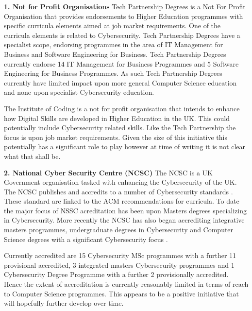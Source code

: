 \documentclass[sigconf,anonymous]{acmart}
\begin{document}
\textbf{1. Not for Profit Organisations}
Tech Partnership Degrees is a Not For Profit Organisation that provides endorsements to Higher Education programmes with specific curricula elements aimed at job market requirements. One of the curricula elements is related to Cybersecurity. Tech Partnership Degrees have a specialist scope, endorsing programmes in the area of IT Management for Business and Software Engineering for Business.  Tech Partnership Degrees currently endorse 14 IT Management for Business Programmes and 5 Software Engineering for Business Programmes. As such Tech Partnership Degrees currently have limited impact upon more general Computer Science education and none upon specialist Cybersecurity education. 

The Institute of Coding is a not for profit organisation that intends to enhance how Digital Skills are developed in Higher Education in the UK. This could potentially include Cybersecurity related skills. Like the Tech Partnership the focus is upon job market requirements.  Given the size of this initiative this potentially has a significant role to play however at time of writing it is not clear what that shall be.

\textbf{2. National Cyber Security Centre (NCSC)}
The NCSC is a UK Government organisation tasked with enhancing the Cybersecurity of the UK. The NCSC publishes and accredits to a number of Cybersecurity standards \cite{NCSC2018a}. These standard are linked to the ACM recommendations for curricula. To date the major focus of NSSC acreditation has been upon Masters degrees specializing in Cybersecurity. More recently the NCSC has also began accrediting integrative masters programmes, undergraduate degrees in Cybersecurity and Computer Science degrees with a significant Cybersecurity focus \cite{NCSC2018b}.

Currently accredited are 15 Cybersecurity MSc programmes with a further 11 provisional accredited, 3 integrated masters Cybersecurity programmes and 1 Cybersecurity Degree Programme with a further 2 provisionally accredited. Hence the extent of accreditation is currently reasonably limited in terms of reach to Computer Science programmes. This appears to be a positive initiative that will hopefully further develop over time. 
\end{document}
